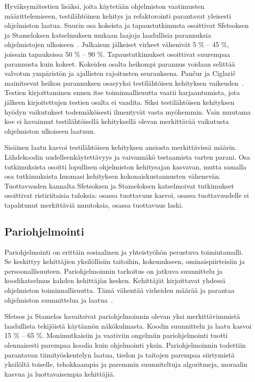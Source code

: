 \documentclass[finnish]{../tktltiki2}
\theoremstyle{definition}
\theoremstyle{remark}
\begin{document}
    Hyväksymätestien lisäksi, joita käytetään ohjelmiston vaatimusten määrit\-telemiseen, testilähtöinen kehitys ja 
refaktorointi parantavat yleisesti ohjelmiston laatua. Suurin osa kokeista ja tapaustutkimusta osoittivat Sfetsoksen ja 
Stameloksen katselmuksen mukaan laajoja laadullisia parannuksia ohjelmistojen ulkoiseen~\cite{SS10}. Julkaisun 
jälkeiset virheet vähenivät 5 \% -- 45 \%, joissain tapauksissa 50 \% -- 90 \%. Tapaustutkimukset osoittivat suurempaa 
parannusta kuin kokeet. Kokeiden osalta heikompi parannus voidaan selittää valvotun ympäristön ja ajallisten rajoitusten 
seurauksena. Pančur ja Ciglarič mainitsevat heikon parannuksen osasyyksi testilähtöisen kehityksen 
vaikeuden~\cite{PC11}. Testien kirjoittaminen ennen itse toiminnallisuutta vaatii harjaantumista, jota jälkeen 
kirjoitettujen testien osalta ei vaadita. Siksi testilähtöisen kehityksen hyödyn vaikutukset todennäköisesti ilmentyvät 
vasta myöhemmin. Vain muutama koe ei havainnut testilähtöisellä kehityksellä olevan merkittävää vaikutusta ohjelmiston 
ulkoiseen laatuun.

    Sisäinen laatu kasvoi testilähtöisen kehityksen ansiosta merkittävissä määrin. Lähdekoodin uudelleenkäytettävyys ja 
vaivannäkö testaamista varten parani. Osa tutkimuksista osoitti lopullisen ohjelmiston kehitysajan kasvavan, mutta 
samalla osa tutkimuksista huomasi kehityksen kokonaiskustannusten vähenevän. Tuottavuuden kannalta Sfetsoksen ja 
Stameloksen katselmoivat tutkimukset osoittivat ristiriitaisia tuloksia: osassa tuottavuus kasvoi, osassa tuottavuudelle 
ei tapahtunut merkittäviä muutoksia, osassa tuottavuus laski.

\subsection{Pariohjelmointi}

Pariohjelmointi on erittäin sosiaalinen ja yhteistyöhön perustuva toimintamalli. Se keskittyy kehittäjien yksilöllisiin 
taitoihin, kokemukseen, ominaispiirteisiin ja persoonallisuuteen. Pariohjelmoinnin tarkoitus on jatkuva suunnittelu ja 
koodikatselmus kahden kehittäjän kesken. Kehittäjät kirjoittavat yhdessä ohjelmiston toiminnallisuutta. Tämä vähentää 
virheiden määrää ja parantaa ohjelmiston suunnittelua ja laatua~\cite{SS10}.

    Sfetsos ja Stamelos havaitsivat pariohjelmoinnin olevan yksi merkittävim\-mistä laadullista tekijöistä käytännön 
näkökulmasta. Koodin suunnittelu ja laatu kasvoi 15 \% -- 65 \%. Monimutkaisiin ja vaativiin ongelmiin pariohjelmointi 
tuotti olennaisesti parempaa koodia kuin ohjelmointi yksin. Pariohjelmoinnin todettiin parantavan tiimityöskentelyn 
laatua, tiedon ja taitojen parempaa siirtymistä yksilöltä toiselle, tehokkaampia ja paremmin suunniteltuja algoritmeja, 
moraalin kasvua ja luottavaisempia kehittäjiä.
\end{document}
